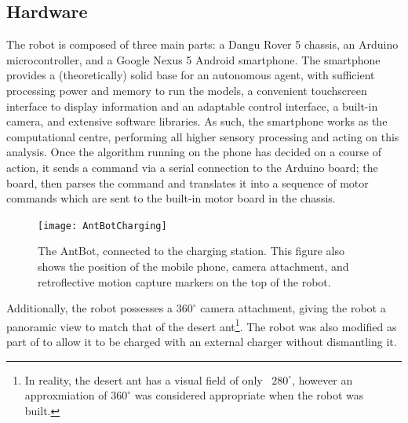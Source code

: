 \documentclass[a4paper,11pt,twoside,openright]{article}
\begin{document}
\subsection{ Hardware }
The robot is composed of three main parts: a Dangu Rover 5 chassis, an
Arduino microcontroller, and a Google Nexus 5 Android smartphone. The
smartphone provides a (theoretically) solid base for an autonomous
agent, with sufficient processing power and memory to run the models,
a convenient touchscreen interface to display information and an
adaptable control interface, a built-in camera, and extensive software
libraries. As such, the smartphone works as the computational centre,
performing all higher sensory processing and acting on this analysis.
Once the algorithm running on the phone has decided on a course of
action, it sends a command via a serial connection to the Arduino
board; the board, then parses the command and translates it into a
sequence of motor commands which are sent to the built-in motor board
in the chassis.\newline\par
\begin{figure}[h!]
  \centering
  \texttt{[image: AntBotCharging]}
  \caption{
    \label{fig:antbotcomp} The AntBot, connected to the charging station.
    This figure also shows the position of the mobile phone, camera attachment,
    and retroflective motion capture markers on the top of the robot.
    }
\end{figure}

Additionally, the robot possesses a $360^{\circ}$ camera attachment, giving the
robot a panoramic view to match that of the desert ant\footnote{In reality,
  the desert ant has a visual field of only ~$280^{\circ}$\cite{Ardin2016},
  however an approxmiation of $360^{\circ}$ was considered appropriate when
  the robot was built.}. The robot was also modified as part of
\cite{Mitchell2018} to allow it to be charged with an external charger without
dismantling it.
\end{document}
